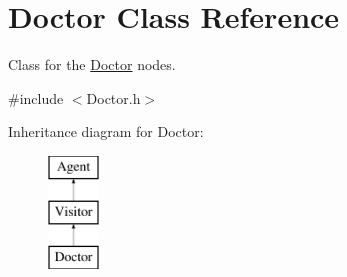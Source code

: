 \hypertarget{classDoctor}{\section{Doctor Class Reference}
\label{classDoctor}
}


Class for the \hyperlink{classDoctor}{Doctor} nodes.  




{\ttfamily \#include $<$Doctor.\-h$>$}

Inheritance diagram for Doctor\-:\begin{figure}[H]
\begin{center}
\leavevmode
\includegraphics[height=3.000000cm]{classDoctor}
\end{center}
\end{figure}
